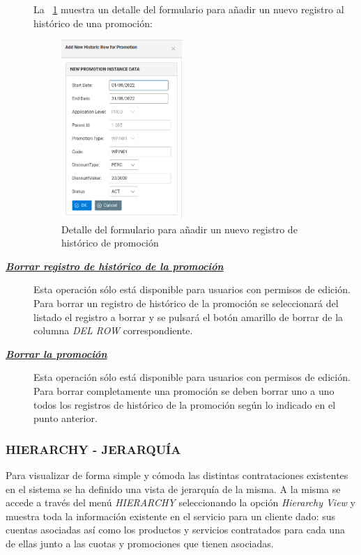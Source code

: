 \begin{description}
La \figurename~\ref{fig:nuevo-historico-promo} muestra un detalle del formulario para añadir un nuevo registro al histórico de una promoción:

\begin{figure}[H]
  \centering
  \includegraphics[width=0.45\textwidth]{imaxes/nuevo-historico-promocion.png}
  \caption{Detalle del formulario para añadir un nuevo registro de histórico de promoción}
  \label{fig:nuevo-historico-promo}
\end{figure}



\item[\underline{\textsl{\textbf{Borrar registro de histórico de la promoción}}}]
Esta operación sólo está disponible para usuarios con permisos de edición.
Para borrar un registro de histórico de la promoción se seleccionará del listado el registro a borrar y se pulsará el botón amarillo de borrar de la columna \textit{DEL ROW} correspondiente.

\item[\underline{\textsl{\textbf{Borrar la promoción}}}]
Esta operación sólo está disponible para usuarios con permisos de edición.
Para borrar completamente una promoción se deben borrar uno a uno todos los registros de histórico de la promoción según lo indicado en el punto anterior. 
\end{description}




\subsubsection{HIERARCHY - JERARQUÍA}

Para visualizar de forma simple y cómoda las distintas contrataciones existentes en el sistema se ha definido una vista de jerarquía de la misma. A la misma se accede a través del menú \emph{HIERARCHY} seleccionando la opción \emph{Hierarchy View} y muestra toda la información existente en el servicio para un cliente dado: sus cuentas asociadas así como los productos y servicios contratados para cada una de ellas junto a las cuotas y promociones que tienen asociadas.

